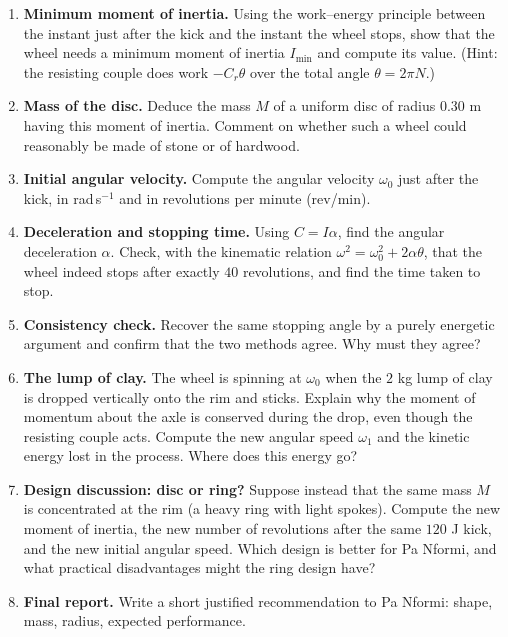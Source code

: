 \documentclass[11pt]{article}
\newcounter{popsec}
\newcounter{popsub}
\newcommand{\courssub}[1]{%
  \stepcounter{popsub}%
  \par\vspace{9pt}\noindent{\popxbold\fontsize{11.5}{13}\selectfont\color{popink}{\color{poporange}\thepopsec.\thepopsub}\hspace{6pt}#1}\par\nopagebreak\vspace{4pt}
}
\begin{document}
\begin{enumerate}
\item \textbf{Minimum moment of inertia.} Using the work--energy principle between the instant just after the kick and the instant the wheel stops, show that the wheel needs a minimum moment of inertia $I_{\min}$ and compute its value. (Hint: the resisting couple does work $-C_r\theta$ over the total angle $\theta=2\pi N$.)
\item \textbf{Mass of the disc.} Deduce the mass $M$ of a uniform disc of radius $0.30$ m having this moment of inertia. Comment on whether such a wheel could reasonably be made of stone or of hardwood.
\item \textbf{Initial angular velocity.} Compute the angular velocity $\omega_0$ just after the kick, in rad\,s$^{-1}$ and in revolutions per minute (rev/min).
\item \textbf{Deceleration and stopping time.} Using $C=I\alpha$, find the angular deceleration $\alpha$. Check, with the kinematic relation $\omega^2=\omega_0^2+2\alpha\theta$, that the wheel indeed stops after exactly $40$ revolutions, and find the time taken to stop.
\item \textbf{Consistency check.} Recover the same stopping angle by a purely energetic argument and confirm that the two methods agree. Why must they agree?
\item \textbf{The lump of clay.} The wheel is spinning at $\omega_0$ when the $2$ kg lump of clay is dropped vertically onto the rim and sticks. Explain why the moment of momentum about the axle is conserved during the drop, even though the resisting couple acts. Compute the new angular speed $\omega_1$ and the kinetic energy lost in the process. Where does this energy go?
\item \textbf{Design discussion: disc or ring?} Suppose instead that the same mass $M$ is concentrated at the rim (a heavy ring with light spokes). Compute the new moment of inertia, the new number of revolutions after the same $120$ J kick, and the new initial angular speed. Which design is better for Pa Nformi, and what practical disadvantages might the ring design have?
\item \textbf{Final report.} Write a short justified recommendation to Pa Nformi: shape, mass, radius, expected performance.
\end{enumerate}

\courssub{Model answer}
\end{document}
